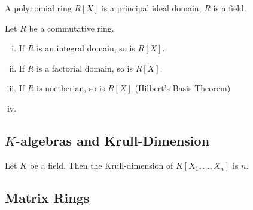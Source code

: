 	\begin{lemma}
		A polynomial ring $R[X]$ is a principal ideal domain,  $R$ is a field.
	\end{lemma}

	\begin{theorem}[Stability]
		Let $R$ be a commutative ring.
		\begin{enumerate}[(i)]
			\item{
				If $R$ is an integral domain, so is $R[X]$.
			}
			\item{
				If $R$ is a factorial domain, so is $R[X]$.
			}
			\item{
				If $R$ is noetherian, so is $R[X]$ (Hilbert's Basis Theorem)
			}
			\item{
			}
		\end{enumerate}
	\end{theorem}

	\subsection{$K$-algebras and Krull-Dimension}

	\begin{theorem}
		Let $K$ be a field. Then the Krull-dimension of $K[X_1,...,X_n]$ is $n$.
	\end{theorem}

	\subsection{Matrix Rings}

